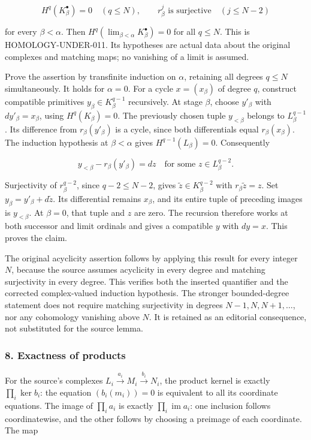 \documentclass[11pt]{article}
\begin{document}
\[
H^q(K_\beta^\bullet)=0\quad(q\leq N),\qquad
r_\beta^j\text{ is surjective}\quad(j\leq N-2)
\]

for every \(\beta<\alpha\). Then \(H^q(\lim_{\beta<\alpha}K_\beta^\bullet)=0\) for all \(q\leq N\). This is HOMOLOGY-UNDER-011. Its hypotheses are actual data about the original complexes and matching maps; no vanishing of a limit is assumed.

Prove the assertion by transfinite induction on \(\alpha\), retaining all degrees \(q\leq N\) simultaneously. It holds for \(\alpha=0\). For a cycle \(x=(x_\beta)\) of degree \(q\), construct compatible primitives \(y_\beta\in K_\beta^{q-1}\) recursively. At stage \(\beta\), choose \(y'_\beta\) with \(dy'_\beta=x_\beta\), using \(H^q(K_\beta)=0\). The previously chosen tuple \(y_{<\beta}\) belongs to \(L_\beta^{q-1}\). Its difference from \(r_\beta(y'_\beta)\) is a cycle, since both differentials equal \(r_\beta(x_\beta)\). The induction hypothesis at \(\beta<\alpha\) gives \(H^{q-1}(L_\beta)=0\). Consequently

\[
y_{<\beta}-r_\beta(y'_\beta)=dz
\quad\text{for some }z\in L_\beta^{q-2}.
\]

Surjectivity of \(r_\beta^{q-2}\), since \(q-2\leq N-2\), gives \(\widetilde z\in K_\beta^{q-2}\) with \(r_\beta\widetilde z=z\). Set \(y_\beta=y'_\beta+d\widetilde z\). Its differential remains \(x_\beta\), and its entire tuple of preceding images is \(y_{<\beta}\). At \(\beta=0\), that tuple and \(z\) are zero. The recursion therefore works at both successor and limit ordinals and gives a compatible \(y\) with \(dy=x\). This proves the claim.

The original acyclicity assertion follows by applying this result for every integer \(N\), because the source assumes acyclicity in every degree and matching surjectivity in every degree. This verifies both the inserted quantifier and the corrected complex-valued induction hypothesis. The stronger bounded-degree statement does not require matching surjectivity in degrees \(N-1,N,N+1,\ldots\), nor any cohomology vanishing above \(N\). It is retained as an editorial consequence, not substituted for the source lemma.

\subsubsection{8. Exactness of products}\label{exactness-of-products}

For the source's complexes \(L_i\xrightarrow{a_i}M_i\xrightarrow{b_i}N_i\), the product kernel is exactly \(\prod_i\ker b_i\): the equation \((b_i(m_i))=0\) is equivalent to all its coordinate equations. The image of \(\prod_i a_i\) is exactly \(\prod_i\operatorname{im}a_i\): one inclusion follows coordinatewise, and the other follows by choosing a preimage of each coordinate. The map
\end{document}
